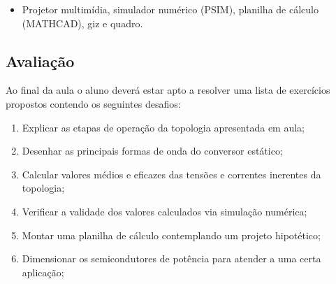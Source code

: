 \documentclass[
	article,			%
	12pt,				%
	twoside,			%
	a4paper,			%
	english,			%
	brazil,				%
	sumario=tradicional
]{abntex2-modelo-plano-de-aula}
\begin{document}
\begin{itemize}
	
	\item Projetor multimídia, simulador numérico (PSIM), planilha de cálculo (MATHCAD), giz e quadro.
	
\end{itemize}

\begin{snugshade}
	\section{Avaliação} %
\end{snugshade}

Ao final da aula o aluno deverá estar apto a resolver uma lista de exercícios propostos contendo os seguintes desafios:

\begin{enumerate}	
	\item Explicar as etapas de operação da topologia apresentada em aula;
	\item Desenhar as principais formas de onda do conversor estático;
	\item Calcular valores médios e eficazes das tensões e correntes inerentes da topologia;
	\item Verificar a validade dos valores calculados via simulação numérica;
	\item Montar uma planilha de cálculo contemplando um projeto hipotético;
	\item Dimensionar os semicondutores de potência para atender a uma certa aplicação;	
\end{enumerate}

\clearpage

\end{document}
